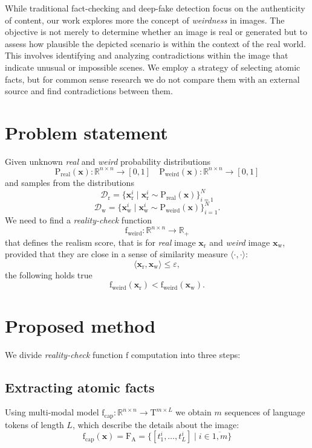 \documentclass[11pt]{article}
\begin{document}
While traditional fact-checking and deep-fake detection focus on the authenticity of content, our work explores more the concept of \textit{weirdness} in images. The objective is not merely to determine whether an image is real or generated but to assess how plausible the depicted scenario is within the context of the real world. This involves identifying and analyzing contradictions within the image that indicate unusual or impossible scenes. We employ a strategy of selecting atomic facts, but for common sense research we do not compare them with an external source and find contradictions between them.

\section{Problem statement}

Given unknown \textit{real} and \textit{weird} probability distributions \[\mathrm{P}_\text{real}(\textbf{x}): \mathbb{R}^{n\times n} \to [0, 1] \quad \mathrm{P}_\text{weird}(\textbf{x}): \mathbb{R}^{n\times n} \to [0, 1]\]
and samples from the distributions
\[\mathcal{D}_\text{r} = \{\textbf{x}^i_\text{r}\;|\; \textbf{x}^i_\text{r} \sim \mathrm{P}_\text{real}(\textbf{x})\}_{i=1}^N\]
\[\mathcal{D}_\text{w} = \{\textbf{x}^i_\text{w}\;|\; \textbf{x}^i_\text{w}\sim \mathrm{P}_\text{weird}(\textbf{x})\}_{i=1}^N.\]
We need to find a \textit{reality-check} function
\[\text{f}_\text{weird}: \mathbb{R}^{n\times n} \to \mathbb{R}_+\]
that defines the realism score, that is for \textit{real} image $\textbf{x}_\text{r}$ and \textit{weird} image $\textbf{x}_\text{w}$, provided that they are close in a sense of similarity measure $\langle \cdot, \cdot \rangle$:
\[ \langle \textbf{x}_\text{r}, \textbf{x}_\text{w}\rangle \le \varepsilon,\]
the following holds true
\[\text{f}_\text{weird}(\textbf{x}_\text{r}) < \text{f}_\text{weird}(\textbf{x}_\text{w}).\]

\section{Proposed method}

We divide \textit{reality-check} function $\text{f}$ computation into three steps:

\subsection{Extracting atomic facts}

Using multi-modal model $\text{f}_\text{cap}: \mathbb{R}^{n\times n} \to \mathrm{T}^{m\times L}$ we obtain $m$ sequences of language tokens of length $L$, which describe the details about the image:
\[\text{f}_\text{cap}(\textbf{x}) = \mathrm{F}_\text{A} = \{[t^i_1, \dots, t^i_L]\;|\; i \in \overline{1, m} \} \]
\end{document}
